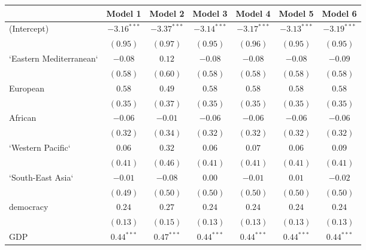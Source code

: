 
\begin{table}[!h]
\begin{center}
\begin{tabular}{l c c c c c c }
\toprule
 & Model 1 & Model 2 & Model 3 & Model 4 & Model 5 & Model 6 \\
\midrule
(Intercept)             & $-3.16^{***}$ & $-3.37^{***}$ & $-3.14^{***}$ & $-3.17^{***}$ & $-3.13^{***}$ & $-3.19^{***}$ \\
                        & $(0.95)$      & $(0.97)$      & $(0.95)$      & $(0.96)$      & $(0.95)$      & $(0.95)$      \\
`Eastern Mediterranean` & $-0.08$       & $0.12$        & $-0.08$       & $-0.08$       & $-0.08$       & $-0.09$       \\
                        & $(0.58)$      & $(0.60)$      & $(0.58)$      & $(0.58)$      & $(0.58)$      & $(0.58)$      \\
European                & $0.58$        & $0.49$        & $0.58$        & $0.58$        & $0.58$        & $0.58$        \\
                        & $(0.35)$      & $(0.37)$      & $(0.35)$      & $(0.35)$      & $(0.35)$      & $(0.35)$      \\
African                 & $-0.06$       & $-0.01$       & $-0.06$       & $-0.06$       & $-0.06$       & $-0.06$       \\
                        & $(0.32)$      & $(0.34)$      & $(0.32)$      & $(0.32)$      & $(0.32)$      & $(0.32)$      \\
`Western Pacific`       & $0.06$        & $0.32$        & $0.06$        & $0.07$        & $0.06$        & $0.09$        \\
                        & $(0.41)$      & $(0.46)$      & $(0.41)$      & $(0.41)$      & $(0.41)$      & $(0.41)$      \\
`South-East Asia`       & $-0.01$       & $-0.08$       & $0.00$        & $-0.01$       & $0.01$        & $-0.02$       \\
                        & $(0.49)$      & $(0.50)$      & $(0.50)$      & $(0.50)$      & $(0.50)$      & $(0.50)$      \\
democracy               & $0.24$        & $0.27$        & $0.24$        & $0.24$        & $0.24$        & $0.24$        \\
                        & $(0.13)$      & $(0.15)$      & $(0.13)$      & $(0.13)$      & $(0.13)$      & $(0.13)$      \\
GDP                     & $0.44^{***}$  & $0.47^{***}$  & $0.44^{***}$  & $0.44^{***}$  & $0.44^{***}$  & $0.44^{***}$  \\

\end{tabular}
\end{center}
\end{table}
